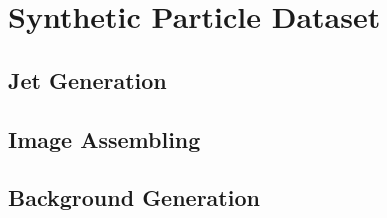 \chapter{Synthetic Particle Dataset}

\section{Jet Generation}

\section{Image Assembling}

\section{Background Generation}